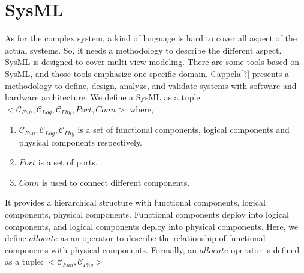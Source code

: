 




\section{SysML}

As for the complex system, a kind of language is hard to cover all aspect of the actual systems. So, it needs a methodology to describe the different aspect. SysML is designed to cover multi-view modeling. There are some tools based on SysML, and those tools emphasize one specific domain. {\color{red}Cappela[?] presents a methodology to define, design, analyze, and validate systems with software and hardware architecture.}  We define a SysML as a tuple $<\mathcal{C}_{Fun}, \mathcal{C}_{Log}, \mathcal{C}_{Phy}, Port, Conn>$ where,
\begin{enumerate}
\item $\mathcal{C}_{Fun}, \mathcal{C}_{Log}, \mathcal{C}_{Phy}$ is a set of functional components, logical components and physical components respectively.
\item $Port$ is a set of ports.
\item $Conn$ is used to connect different components.
\end{enumerate}

It provides a hierarchical structure with functional components, logical components, physical components. Functional components deploy into logical components, and logical components deploy into physical components. Here, we define $allocate$ as an operator to describe the relationship of functional components with physical components. Formally, an $allocate$ operator is defined as a tuple: $<\mathcal{C}_{Fun}, \mathcal{C}_{Phy}>$

